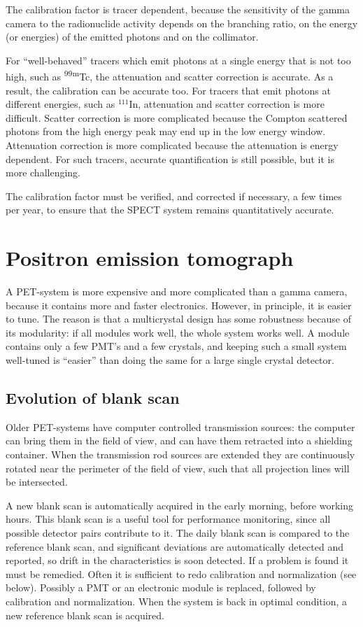 \documentclass[11pt,oneside]{book}
\begin{document}
The calibration factor is tracer dependent, because the sensitivity of
the gamma camera to the radionuclide activity depends on the branching
ratio, on the energy (or energies) of the emitted photons and on the
collimator.

For ``well-behaved'' tracers which emit photons at a single energy
that is not too high, such as \textsuperscript{99m}Tc, the attenuation and scatter
correction is accurate. As a result, the calibration can be accurate
too. For tracers that emit photons at different energies, such as
$^{111}$In, attenuation and scatter correction is more
difficult. Scatter correction is more complicated because the Compton
scattered photons from the high energy peak may end up in the low
energy window. Attenuation correction is more complicated because the
attenuation is energy dependent. For such tracers, accurate
quantification is still possible, but it is more challenging.

The calibration factor must be verified, and corrected if necessary, a
few times per year, to ensure that the SPECT system remains
quantitatively accurate.

\section{Positron emission tomograph}
A PET-system is more expensive and more complicated than a gamma camera,
because it contains more and faster electronics. However, in principle,
it is easier to tune. The reason is that a multicrystal design has some
robustness because of its modularity: if all modules work well, the whole
system works well. A module contains only a few PMT's and a few crystals, and
keeping such a small system well-tuned is ``easier'' than doing the same for a
large single crystal detector.

\subsection{Evolution of blank scan}
Older PET-systems have computer controlled transmission sources: the
computer can bring them in the field of view, and can have them
retracted into a shielding container. When the transmission rod
sources are extended they are continuously rotated near the perimeter
of the field of view, such that all projection lines will be
intersected.

A new blank scan is automatically acquired in the early morning,
before working hours. This blank scan is a useful tool for performance
monitoring, since all possible detector pairs contribute to it.  The
daily blank scan is compared to the reference blank scan, and
significant deviations are automatically detected and reported, so
drift in the characteristics is soon detected. If a problem is found
it must be remedied. Often it is sufficient to redo calibration and
normalization (see below). Possibly a PMT or an electronic module is
replaced, followed by calibration and normalization. When the system
is back in optimal condition, a new reference blank scan is acquired.
\end{document}
